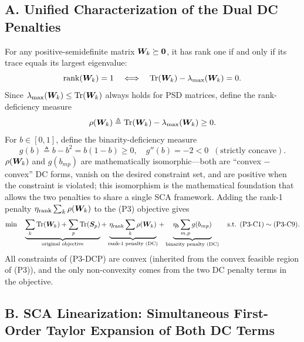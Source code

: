 \subsection*{A. Unified Characterization of the Dual DC Penalties}

For any positive-semidefinite matrix $\bm{W}_k \succeq \bm{0}$, it has rank one if and only if its trace equals its largest eigenvalue:
\begin{equation}\label{eq:rank1-equivalence}
\operatorname{rank}(\bm{W}_k) = 1 \quad \Longleftrightarrow \quad \operatorname{Tr}(\bm{W}_k) - \lambda_{\max}(\bm{W}_k) = 0.
\end{equation}
Since $\lambda_{\max}(\bm{W}_k) \leq \operatorname{Tr}(\bm{W}_k)$ always holds for PSD matrices, define the rank-deficiency measure
\begin{equation}\label{eq:rho-def}
\rho(\bm{W}_k) \triangleq \operatorname{Tr}(\bm{W}_k) - \lambda_{\max}(\bm{W}_k) \geq 0.
\end{equation}
For $b \in [0,1]$, define the binarity-deficiency measure
\begin{equation}\label{eq:g-def}
g(b) \triangleq b - b^2 = b(1-b) \geq 0, \quad g''(b) = -2 < 0 \;\; (\text{strictly concave}).
\end{equation}
$\rho(\bm{W}_k)$ and $g(b_{mp})$ are mathematically isomorphic---both are ``convex $-$ convex'' DC forms, vanish on the desired constraint set, and are positive when the constraint is violated; this isomorphism is the mathematical foundation that allows the two penalties to share a single SCA framework. Adding the rank-1 penalty $\eta_{\text{rank}} \sum_k \rho(\bm{W}_k)$ to the (P3) objective gives
\begin{equation}\label{eq:p3-dcp}
\min \quad \underbrace{\sum_k \operatorname{Tr}(\bm{W}_k) + \sum_p \operatorname{Tr}(\bm{S}_p)}_{\text{original objective}} + \underbrace{\eta_{\text{rank}} \sum_k \rho(\bm{W}_k)}_{\text{rank-1 penalty (DC)}} + \underbrace{\eta_b \sum_{m,p} g(b_{mp})}_{\text{binarity penalty (DC)}} \quad \text{s.t. (P3-C1)} \sim \text{(P3-C9)}.
\end{equation}
All constraints of (P3-DCP) are convex (inherited from the convex feasible region of (P3)), and the only non-convexity comes from the two DC penalty terms in the objective.

\subsection*{B. SCA Linearization: Simultaneous First-Order Taylor Expansion of Both DC Terms}

